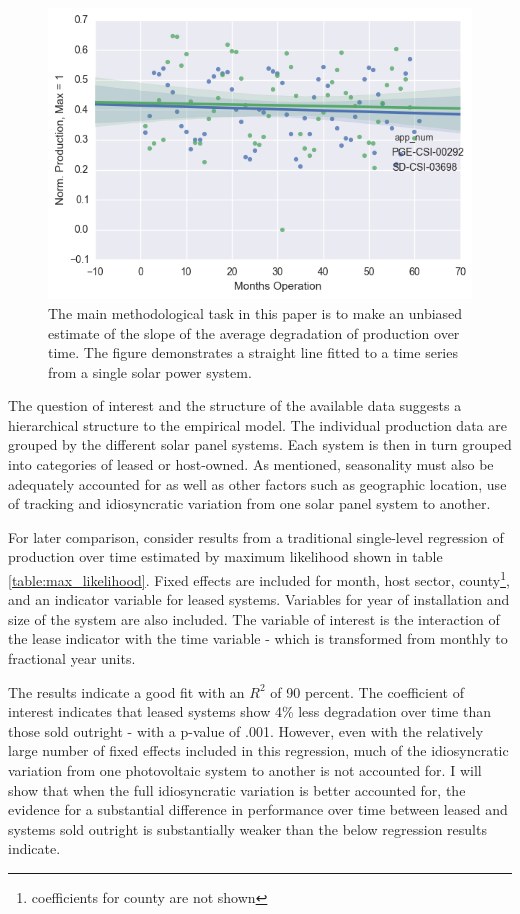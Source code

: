 \documentclass[12pt]{article}
\begin{document}
\begin{figure}
	\includegraphics[width=1\textwidth]{example_prod.png}
	\caption{The main methodological task in this paper is to make an unbiased estimate of the slope of the average degradation of production over time. The figure demonstrates a straight line fitted to a time series from a single solar power system.}
	\label{example_prod}
\end{figure}

The question of interest and the structure of the available data suggests a hierarchical structure to the empirical model. The individual production data are grouped by the different solar panel systems. Each system is then in turn grouped into categories of leased or host-owned. As mentioned, seasonality must also be adequately accounted for as well as other factors such as geographic location, use of tracking and idiosyncratic variation from one solar panel system to another.

For later comparison, consider results from a traditional single-level regression of production over time estimated by maximum likelihood shown in table \ref{table:max_likelihood}. Fixed effects are included for month, host sector, county\footnote{coefficients for county are not shown}, and an indicator variable for leased systems. Variables for year of installation and size of the system are also included. The variable of interest is the interaction of the lease indicator with the time variable - which is transformed from monthly to fractional year units.

The results indicate a good fit with an $R^2$ of 90 percent. The coefficient of interest indicates that leased systems show 4\% less degradation over time than those sold outright - with a p-value of .001. However, even with the relatively large number of fixed effects included in this regression, much of the idiosyncratic variation from one photovoltaic system to another is not accounted for. I will show that when the full idiosyncratic variation is better accounted for, the evidence for a substantial difference in performance over time between leased and systems sold outright is substantially weaker than the below regression results indicate. 
\end{document}
